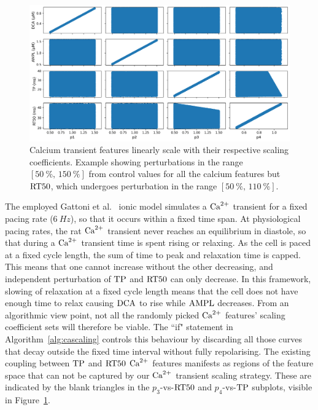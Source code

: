 \begin{figure}[ht!]
    \myfloatalign
    \includegraphics[width=\textwidth]{figures/chapter06/p_vs_b.png}
    \caption{Calcium transient features linearly scale with their respective scaling coefficients. Example showing perturbations in the range $[\SI{50}{\percent},\,\SI{150}{\percent}]$ from control values for all the calcium features but $\textrm{RT50}$, which undergoes perturbation in the range $[\SI{50}{\percent},\,\SI{110}{\percent}]$.}
    \label{fig:scalersvscafeatures}
\end{figure}

\vspace{0.2cm}
The employed Gattoni et al.~\cite{Gattoni:2017} ionic model simulates a $\textrm{Ca}^{2+}$ transient for a fixed pacing rate ($\SI{6}{Hz}$), so that it occurs within a fixed time span. At physiological pacing rates, the rat $\textrm{Ca}^{2+}$ transient never reaches an equilibrium in diastole, so that during a $\textrm{Ca}^{2+}$ transient time is spent rising or relaxing. As the cell is paced at a fixed cycle length, the sum of time to peak and relaxation time is capped. This means that one cannot increase without the other decreasing, and independent perturbation of $\textrm{TP}$ and $\textrm{RT50}$ can only decrease. In this framework, slowing of relaxation at a fixed cycle length means that the cell does not have enough time to relax causing $\textrm{DCA}$ to rise while $\textrm{AMPL}$ decreases. From an algorithmic view point, not all the randomly picked $\textrm{Ca}^{2+}$ features' scaling coefficient sets will therefore be viable. The ``if" statement in Algorithm~\ref{alg:cascaling} controls this behaviour by discarding all those curves that decay outside the fixed time interval without fully repolarising. The existing coupling between $\textrm{TP}$ and $\textrm{RT50}$ $\textrm{Ca}^{2+}$ features manifests as regions of the feature space that can not be captured by our $\textrm{Ca}^{2+}$ transient scaling strategy. These are indicated by the blank triangles in the $p_3$-vs-$\textrm{RT50}$ and $p_4$-vs-$\textrm{TP}$ subplots, visible in Figure~\ref{fig:scalersvscafeatures}.


